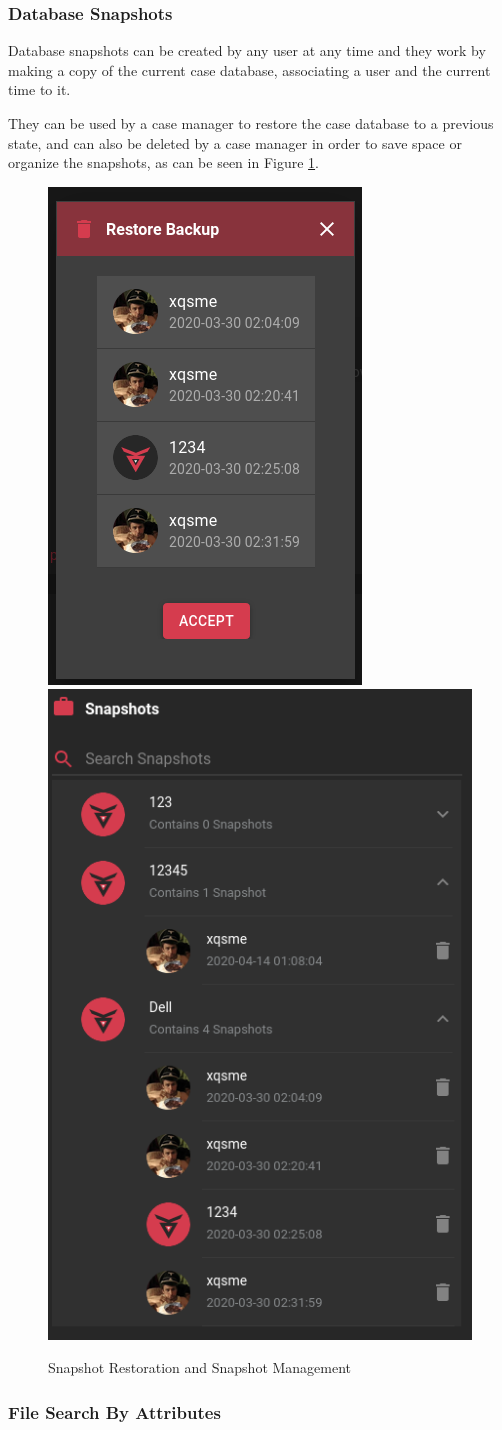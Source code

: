 \subsubsection*{Database Snapshots}

Database snapshots can be created by any user at any time and they work by making a copy of the current case database, associating a user and the current time to it.

They can be used by a case manager to restore the case database to a previous state, and can also be deleted by a case manager in order to save space or organize the snapshots, as can be seen in Figure \ref{fig:snapshotrestore}.

\begin{figure}[ht]
 \centering
 \includegraphics[width=0.35\linewidth]{imgs/snapshotrestore.png}
 \includegraphics[width=0.35\linewidth]{imgs/snapshotmanage.png}
 \caption{Snapshot Restoration and Snapshot Management}
 \label{fig:snapshotrestore}
\end{figure}

\subsubsection*{File Search By Attributes}

